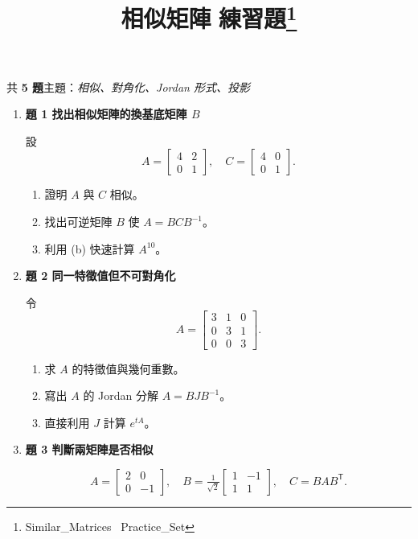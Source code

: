 \documentclass[12pt]{article}
\title{相似矩陣\,\textendash\,練習題\thanks{Similar\_Matrices \textendash\ Practice\_Set}}
\author{}
\date{}
\begin{document}
\maketitle

共 \textbf{5 題}\quad 主題：\textit{相似、對角化、Jordan 形式、投影}\bigskip

\begin{enumerate}[label=\arabic*., leftmargin=0pt, itemindent=2em]

\item \textbf{題 1\; 找出相似矩陣的換基底矩陣 $B$}

設
\[
A = \begin{bmatrix}4 & 2 \\ 0 & 1\end{bmatrix},\quad
C = \begin{bmatrix}4 & 0 \\ 0 & 1\end{bmatrix}.
\]

\begin{enumerate}[label=\alph*]
  \item 證明 $A$ 與 $C$ 相似。
  \item 找出可逆矩陣 $B$ 使 $A = BCB^{-1}$。
  \item 利用 (b) 快速計算 $A^{10}$。
\end{enumerate}

\item \textbf{題 2\; 同一特徵值但不可對角化}

令
\[
A = \begin{bmatrix}3 & 1 & 0 \\ 0 & 3 & 1 \\ 0 & 0 & 3\end{bmatrix}.
\]

\begin{enumerate}[label=\alph*]
  \item 求 $A$ 的特徵值與幾何重數。
  \item 寫出 $A$ 的 Jordan 分解 $A = BJB^{-1}$。
  \item 直接利用 $J$ 計算 $\displaystyle e^{tA}$。
\end{enumerate}

\item \textbf{題 3\; 判斷兩矩陣是否相似}

\[
A = \begin{bmatrix}2 & 0 \\ 0 & -1\end{bmatrix},\quad
B = \tfrac{1}{\sqrt 2}\begin{bmatrix}1 & -1 \\ 1 & 1\end{bmatrix},\quad
C = BAB^{\mathsf T}.
\]


\end{enumerate}
\end{document}
